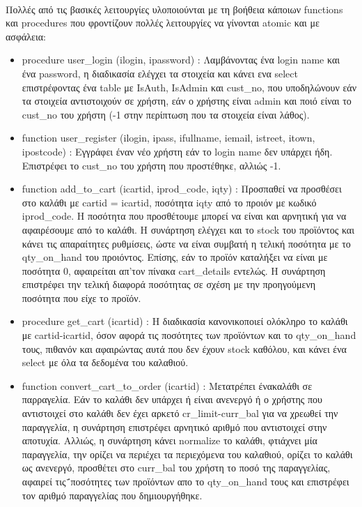 \documentclass[12pt]{article}
\begin{document}
  	  \paragraph{}
  	  	Πολλές από τις βασικές λειτουργίες υλοποιούνται με τη βοήθεια κάποιων functions και procedures που φροντίζουν πολλές λειτουργίες να γίνονται atomic και με ασφάλεια:
  	  	\begin{itemize}
  	  		\item procedure user\_login (ilogin, ipassword) : Λαμβάνοντας ένα login name και ένα password, η διαδικασία ελέγχει τα στοιχεία και κάνει ενα select επιστρέφοντας ένα table με IsAuth, IsAdmin και cust\_no, που υποδηλώνουν εάν τα στοιχεία αντιστοιχούν σε χρήστη, εάν ο χρήστης είναι admin και ποιό είναι το cust\_no του χρήστη (-1 στην περίπτωση που τα στοιχεία είναι λάθος).
  	  		\item function user\_register (ilogin, ipass, ifullname, iemail, istreet, itown, ipostcode) : Εγγράφει έναν νέο χρήστη εάν το login name δεν υπάρχει ήδη. Επιστρέφει το cust\_no του χρήστη που προστέθηκε, αλλιώς -1.
  	  		\item function add\_to\_cart (icartid, iprod\_code, iqty) : Προσπαθεί να προσθέσει στο καλάθι με cartid = icartid, ποσότητα iqty από το προιόν με κωδικό iprod\_code. Η ποσότητα που προσθέτουμε μπορεί να είναι και αρνητική για να αφαιρέσουμε από το καλάθι. Η συνάρτηση ελέγχει και το stock του προϊόντος και κάνει τις απαραίτητες ρυθμίσεις, ώστε να είναι συμβατή η τελική ποσότητα με το qty\_on\_hand του προιόντος. Επίσης, εάν το προϊόν καταλήξει να είναι με ποσότητα 0, αφαιρείται απ'τον πίνακα cart\_details εντελώς. Η συνάρτηση επιστρέφει την τελική διαφορά ποσότητας σε σχέση με την προηγούμενη ποσότητα που είχε το προϊόν.
  	  		\item procedure get\_cart (icartid) : Η διαδικασία κανονικοποιεί ολόκληρο το καλάθι με cartid-icartid, όσον αφορά τις ποσότητες των προϊόντων και το qty\_on\_hand τους, πιθανόν και αφαιρώντας αυτά που δεν έχουν stock καθόλου, και κάνει ένα select με όλα τα δεδομένα του καλαθιού.
  	  		\item function convert\_cart\_to\_order (icartid) : Μετατρέπει ένακαλάθι σε παρραγελία. Εάν το καλάθι δεν υπάρχει ή είναι ανενεργό ή ο χρήστης που αντιστοιχεί στο καλάθι δεν έχει αρκετό cr\_limit-curr\_bal για να χρεωθεί την παραγγελία, η συνάρτηση επιστρέφει αρνητικό αριθμό που αντιστοιχεί στην αποτυχία. Αλλιώς, η συνάρτηση κάνει normalize το καλάθι, φτιάχνει μία παραγγελία, την ορίζει να περιέχει τα περιεχόμενα του καλαθιού, ορίζει το καλάθι ως ανενεργό, προσθέτει στο curr\_bal του χρήστη το ποσό της παραγγελίας, αφαιρεί τις΅ποσότητες των προϊόντων απο το qty\_on\_hand τους και επιστρέφει τον αριθμό παραγγελίας που δημιουργήθηκε.

\end{itemize}
\end{document}
